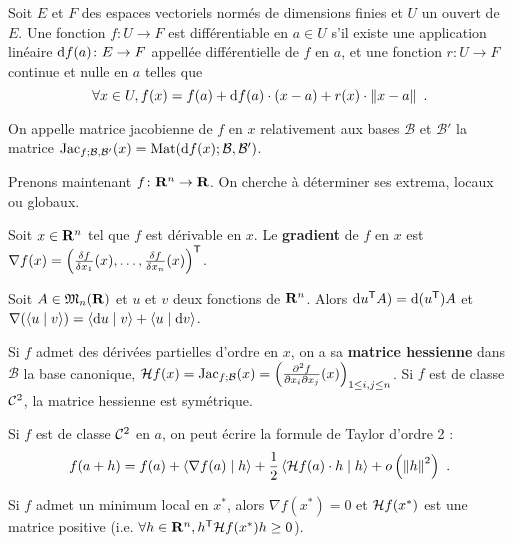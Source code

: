 \begin{defn}
	Soit $E$ et $F$ des espaces vectoriels normés de dimensions finies et $U$ un ouvert de $E$.
	Une fonction $f \colon U \to F$ est différentiable en $a \in U$ s'il existe une application linéaire $\mathop{}\mathopen{}\mathrm{d} f(a) \colon E \to F$ appellée différentielle de $f$ en $a$, et une fonction $r \colon U \to F$ continue et nulle en $a$ telles que
	$$\forall x \in U, f(x) = f(a) + \mathop{}\mathopen{}\mathrm{d} f(a) \cdot (x - a) + r(x) \cdot \left\lVert x - a\right\rVert\ .$$
\end{defn}

\begin{defn}
	On appelle matrice jacobienne de $f$ en $x$ relativement aux bases $\mathcal{B}$ et $\mathcal{B}'$ la matrice $\operatorname{Jac}_{f ; \mathcal{B}, \mathcal{B}'}(x) = \operatorname{Mat}( \mathop{}\mathopen{}\mathrm{d} f(x) ; \mathcal{B} , \mathcal{B}')$.
\end{defn}

Prenons maintenant $f \colon \mathbf{R}^n \to \mathbf{R}$. On cherche à déterminer ses extrema, locaux ou globaux.

\begin{defn}
	Soit $x \in \mathbf{R}^n$ tel que $f$ est dérivable en $x$.
	Le \textbf{gradient} de $f$ en $x$ est $\nabla f(x) = \left( \frac{\delta f}{\delta x_1}(x), \ldots, \frac{\delta f}{\delta x_n}(x) \right)^\mathsf{T}$.
\end{defn} 

\begin{pop}
	Soit $A \in \mathfrak{M}_n(\mathbf{R})$ et $u$ et $v$ deux fonctions de $\mathbf{R}^n$.
	Alors $\mathop{}\mathopen{}\mathrm{d} u^\mathsf{T} A) = \mathop{}\mathopen{}\mathrm{d}(u^\mathsf{T}) A$ et $\nabla (\left\langle u \mid v \right\rangle) = \left\langle \mathop{}\mathopen{}\mathrm{d} u \mid v \right\rangle + \left\langle u \mid \mathop{}\mathopen{}\mathrm{d} v \right\rangle$.
\end{pop}

\begin{defn}
	Si $f$ admet des dérivées partielles d'ordre en $x$, on a sa \textbf{matrice hessienne} dans $\mathcal{B}$ la base canonique, $\mathcal{H} f(x) = \operatorname{Jac}_{f ; \mathcal{B}}(x) = \left( \frac{\partial^2 f}{\partial x_i \partial x_j}(x) \right)_{1 \leq i,j \leq n}$.
	Si $f$ est de classe $\mathcal{C}^2$, la matrice hessienne est symétrique.
\end{defn}

\begin{pop}
	Si $f$ est de classe $\mathcal{C}^2$ en $a$, on peut écrire la formule de Taylor d'ordre 2 :
	$$f(a + h) = f(a) + \scal{\nabla f(a)}{h} + \frac{1}{2} \scal{\hess f(a) \cdot h}{h} + o \left( \norme{h}^2 \right)\ .$$
\end{pop}

\begin{thm}
	Si $f$ admet un minimum local en $x^*$, alors $\nabla f(x^*) = 0$ et $\mathcal{H} f(x^*)$ est une matrice positive (i.e. $\forall h \in \mathbf{R}^n, h^\mathsf{T} \mathcal{H} f(x^*) h \geq 0$).
\end{thm}

